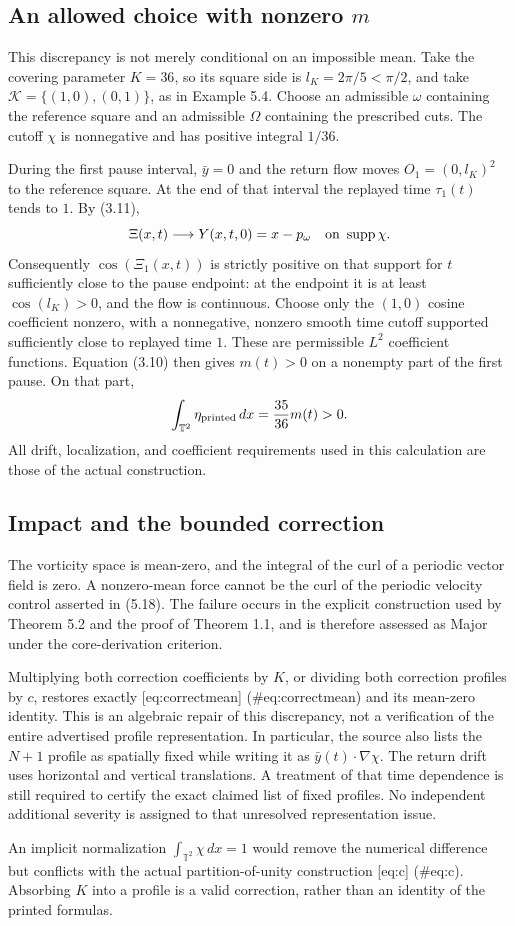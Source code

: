 \documentclass[10pt]{article}
\begin{document}
\subsection*{An allowed choice with nonzero \(m\)}
This discrepancy is not merely conditional on an impossible mean. Take the covering parameter \(K=36\), so its square side is \(l_K=2\pi/5<\pi/2\), and take \(\mathcal K=\{(1,0),(0,1)\}\), as in Example 5.4. Choose an admissible \(\omega\) containing the reference square and an admissible \(\Omega\) containing the prescribed cuts. The cutoff \(\chi\) is nonnegative and has positive integral \(1/36\).\par
During the first pause interval, \(\bar y=0\) and the return flow moves \(O_1=(0,l_K)^2\) to the reference square. At the end of that interval the replayed time \(\tau_1(t)\) tends to \(1\). By (3.11), \[\Xi(x,t)\longrightarrow Y(x,t,0)=x-p_\omega
 \quad\hbox{on }\operatorname{supp}\chi.\] Consequently \(\cos(\Xi_1(x,t))\) is strictly positive on that support for \(t\) sufficiently close to the pause endpoint: at the endpoint it is at least \(\cos(l_K)>0\), and the flow is continuous. Choose only the \((1,0)\) cosine coefficient nonzero, with a nonnegative, nonzero smooth time cutoff supported sufficiently close to replayed time \(1\). These are permissible \(L^2\) coefficient functions. Equation (3.10) then gives \(m(t)>0\) on a nonempty part of the first pause. On that part, \[\int_{\mathbb T^2}\eta_{\rm printed}\,dx=\frac{35}{36}m(t)>0.\] All drift, localization, and coefficient requirements used in this calculation are those of the actual construction.\par
\subsection*{Impact and the bounded correction}
The vorticity space is mean-zero, and the integral of the curl of a periodic vector field is zero. A nonzero-mean force cannot be the curl of the periodic velocity control asserted in (5.18). The failure occurs in the explicit construction used by Theorem 5.2 and the proof of Theorem 1.1, and is therefore assessed as Major under the core-derivation criterion.\par
Multiplying both correction coefficients by \(K\), or dividing both correction profiles by \(c\), restores exactly [eq:correctmean] (\#eq:correctmean) and its mean-zero identity. This is an algebraic repair of this discrepancy, not a verification of the entire advertised profile representation. In particular, the source also lists the \(N+1\) profile as spatially fixed while writing it as \(\bar y(t)\cdot\nabla\chi\). The return drift uses horizontal and vertical translations. A treatment of that time dependence is still required to certify the exact claimed list of fixed profiles. No independent additional severity is assigned to that unresolved representation issue.\par
An implicit normalization \(\int_{\mathbb T^2}\chi\,dx=1\) would remove the numerical difference but conflicts with the actual partition-of-unity construction [eq:c] (\#eq:c). Absorbing \(K\) into a profile is a valid correction, rather than an identity of the printed formulas.\par
\end{document}
